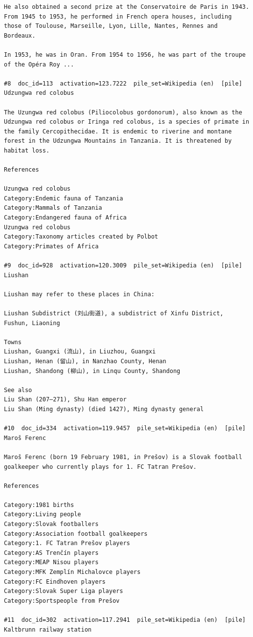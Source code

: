 \begin{verbatim}
He also obtained a second prize at the Conservatoire de Paris in 1943. From 1945 to 1953, he performed in French opera houses, including those of Toulouse, Marseille, Lyon, Lille, Nantes, Rennes and Bordeaux.

In 1953, he was in Oran. From 1954 to 1956, he was part of the troupe of the Opéra Roy ...

#8  doc_id=113  activation=123.7222  pile_set=Wikipedia (en)  [pile]
Udzungwa red colobus

The Uzungwa red colobus (Piliocolobus gordonorum), also known as the Udzungwa red colobus or Iringa red colobus, is a species of primate in the family Cercopithecidae. It is endemic to riverine and montane forest in the Udzungwa Mountains in Tanzania. It is threatened by habitat loss.

References

Uzungwa red colobus
Category:Endemic fauna of Tanzania
Category:Mammals of Tanzania
Category:Endangered fauna of Africa
Uzungwa red colobus
Category:Taxonomy articles created by Polbot
Category:Primates of Africa

#9  doc_id=928  activation=120.3009  pile_set=Wikipedia (en)  [pile]
Liushan

Liushan may refer to these places in China:

Liushan Subdistrict (刘山街道), a subdistrict of Xinfu District, Fushun, Liaoning

Towns
Liushan, Guangxi (流山), in Liuzhou, Guangxi
Liushan, Henan (留山), in Nanzhao County, Henan
Liushan, Shandong (柳山), in Linqu County, Shandong

See also
Liu Shan (207–271), Shu Han emperor
Liu Shan (Ming dynasty) (died 1427), Ming dynasty general

#10  doc_id=334  activation=119.9457  pile_set=Wikipedia (en)  [pile]
Maroš Ferenc

Maroš Ferenc (born 19 February 1981, in Prešov) is a Slovak football goalkeeper who currently plays for 1. FC Tatran Prešov.

References

Category:1981 births
Category:Living people
Category:Slovak footballers
Category:Association football goalkeepers
Category:1. FC Tatran Prešov players
Category:AS Trenčín players
Category:MEAP Nisou players
Category:MFK Zemplín Michalovce players
Category:FC Eindhoven players
Category:Slovak Super Liga players
Category:Sportspeople from Prešov

#11  doc_id=302  activation=117.2941  pile_set=Wikipedia (en)  [pile]
Kaltbrunn railway station


\end{verbatim}
